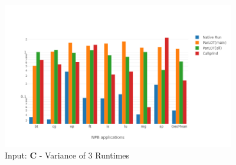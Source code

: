 \begin{figure}[!t]
\centering
\includegraphics[width=4in]{figs.comet/comet_chartAvg_var_C_p3_5.png}
\caption{ Input: \textbf{C}  - Variance of 3 Runtimes
}
\label{comet_chartAvg_var_C_p3_5}
\end{figure}
